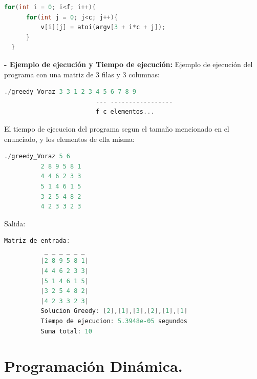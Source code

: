 \documentclass[12pt, letterpaper]{article}
\begin{document}
\begin{itemize}
\begin{lstlisting}[language=C++, basicstyle=\ttfamily\footnotesize]
  for(int i = 0; i<f; i++){
      for(int j = 0; j<c; j++){
          v[i][j] = atoi(argv[3 + i*c + j]);
      }
  } 
          \end{lstlisting}
          \subitem\textbf{- Ejemplo de ejecución y Tiempo de ejecución:}\newline
          Ejemplo de ejecución del programa con una matriz de 3 filas y 3 columnas:
          \begin{lstlisting}[language=C++, basicstyle=\ttfamily\footnotesize]
          ./greedy_Voraz 3 3 1 2 3 4 5 6 7 8 9
                         --- -----------------
                         f c elementos...
          \end{lstlisting}
  \newpage %
          El tiempo de ejecucion del programa segun el tamaño mencionado en el enunciado, y los elementos de ella misma:
          \begin{lstlisting}[language=C++, basicstyle=\ttfamily\footnotesize]
          ./greedy_Voraz 5 6 
          2 8 9 5 8 1 
          4 4 6 2 3 3 
          5 1 4 6 1 5 
          3 2 5 4 8 2 
          4 2 3 3 2 3
          \end{lstlisting}
      Salida:
          \begin{lstlisting}[language=C++, basicstyle=\ttfamily\footnotesize]
          Matriz de entrada:
           _ _ _ _ _ _
          |2 8 9 5 8 1|
          |4 4 6 2 3 3|
          |5 1 4 6 1 5|
          |3 2 5 4 8 2|
          |4 2 3 3 2 3|
          Solucion Greedy: [2],[1],[3],[2],[1],[1]
          Tiempo de ejecucion: 5.3948e-05 segundos
          Suma total: 10
          \end{lstlisting}
      \end{itemize}
  \newpage %

  \section{Programación Dinámica.}
\end{document}
